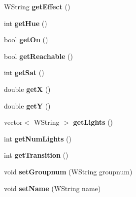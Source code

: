 \begin{DoxyCompactItemize}
\item 
W\+String {\bfseries get\+Effect} ()\hypertarget{classGroup_a84f474a3636ee14812beb1ddc8b85b5c}{}\label{classGroup_a84f474a3636ee14812beb1ddc8b85b5c}

\item 
int {\bfseries get\+Hue} ()\hypertarget{classGroup_aa987a57616beb2d9b84bfb61284cb9b3}{}\label{classGroup_aa987a57616beb2d9b84bfb61284cb9b3}

\item 
bool {\bfseries get\+On} ()\hypertarget{classGroup_a130f7ef2d2c34075c84e7957d6f6edd9}{}\label{classGroup_a130f7ef2d2c34075c84e7957d6f6edd9}

\item 
bool {\bfseries get\+Reachable} ()\hypertarget{classGroup_ab6b9ed2d6c905593e8837aea07579f67}{}\label{classGroup_ab6b9ed2d6c905593e8837aea07579f67}

\item 
int {\bfseries get\+Sat} ()\hypertarget{classGroup_ad81eb4c13f966c37be372796acba0e5b}{}\label{classGroup_ad81eb4c13f966c37be372796acba0e5b}

\item 
double {\bfseries getX} ()\hypertarget{classGroup_a374980af9108689f450d06f1075ccac9}{}\label{classGroup_a374980af9108689f450d06f1075ccac9}

\item 
double {\bfseries getY} ()\hypertarget{classGroup_a9359360dae7f2a628ba7ac1733c01491}{}\label{classGroup_a9359360dae7f2a628ba7ac1733c01491}

\item 
vector$<$ W\+String $>$ {\bfseries get\+Lights} ()\hypertarget{classGroup_a6e31fc668177aca4d8ff66446602973e}{}\label{classGroup_a6e31fc668177aca4d8ff66446602973e}

\item 
int {\bfseries get\+Num\+Lights} ()\hypertarget{classGroup_af191d3b61a57aaccc08a11d75c1ece82}{}\label{classGroup_af191d3b61a57aaccc08a11d75c1ece82}

\item 
int {\bfseries get\+Transition} ()\hypertarget{classGroup_a2917e270bec7ce88165828ee0c224a9d}{}\label{classGroup_a2917e270bec7ce88165828ee0c224a9d}

\item 
void {\bfseries set\+Groupnum} (W\+String groupnum)\hypertarget{classGroup_a43e0e9a4a3c3e937132390bcf4a72108}{}\label{classGroup_a43e0e9a4a3c3e937132390bcf4a72108}

\item 
void {\bfseries set\+Name} (W\+String name)\hypertarget{classGroup_a86ac1b935c83378ff37a1a300265bb41}{}\label{classGroup_a86ac1b935c83378ff37a1a300265bb41}


\end{DoxyCompactItemize}
